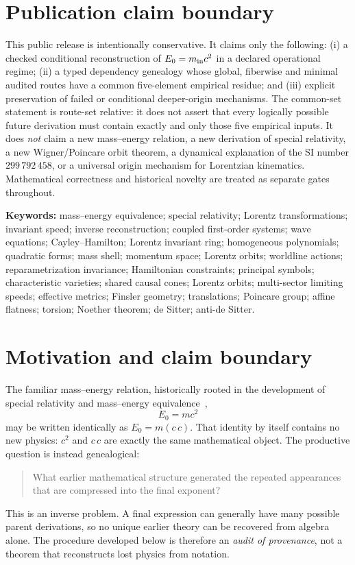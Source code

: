 \documentclass[11pt,a4paper]{article}
\begin{document}
\section*{Publication claim boundary}
This public release is intentionally conservative.  It claims only the following: (i) a checked conditional reconstruction of $E_0=m_{\rm in}c^2$ in a declared operational regime; (ii) a typed dependency genealogy whose global, fiberwise and minimal audited routes have a common five-element empirical residue; and (iii) explicit preservation of failed or conditional deeper-origin mechanisms.  The common-set statement is route-set relative: it does not assert that every logically possible future derivation must contain exactly and only those five empirical inputs.  It does \emph{not} claim a new mass--energy relation, a new derivation of special relativity, a new Wigner/Poincare orbit theorem, a dynamical explanation of the SI number $299\,792\,458$, or a universal origin mechanism for Lorentzian kinematics.  Mathematical correctness and historical novelty are treated as separate gates throughout.

\vspace{0.3em}
\noindent\textbf{Keywords:} mass--energy equivalence; special relativity; Lorentz transformations; invariant speed; inverse reconstruction; coupled first-order systems; wave equations; Cayley--Hamilton; Lorentz invariant ring; homogeneous polynomials; quadratic forms; mass shell; momentum space; Lorentz orbits; worldline actions; reparametrization invariance; Hamiltonian constraints; principal symbols; characteristic varieties; shared causal cones; Lorentz orbits; multi-sector limiting speeds; effective metrics; Finsler geometry; translations; Poincare group; affine flatness; torsion; Noether theorem; de Sitter; anti-de Sitter.

\section{Motivation and claim boundary}
The familiar mass--energy relation, historically rooted in the development of special relativity and mass--energy equivalence~\cite{einstein1905sr,einstein1905mass},
\begin{equation}
E_0=mc^2
\label{eq:emc2}
\end{equation}
may be written identically as $E_0=m(c\,c)$. That identity by itself contains no new physics: $c^2$ and $c\,c$ are exactly the same mathematical object. The productive question is instead genealogical:
\begin{quote}
What earlier mathematical structure generated the repeated appearances that are compressed into the final exponent?
\end{quote}
This is an inverse problem. A final expression can generally have many possible parent derivations, so no unique earlier theory can be recovered from algebra alone. The procedure developed below is therefore an \emph{audit of provenance}, not a theorem that reconstructs lost physics from notation.
\end{document}
